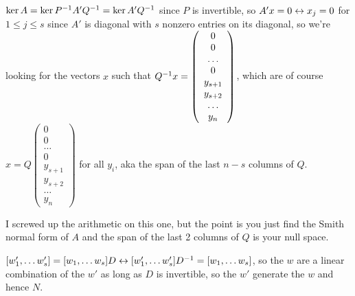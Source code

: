 \documentclass[11pt, oneside]{article}   	%
\begin{document}
\item $\ker{A} = \ker{P^{-1}A'Q^{-1}} = \ker{A'Q^{-1}}$ since $P$ is invertible, so $A'x = 0 \leftrightarrow x_j = 0$ for $1 \le j \le s$ since $A'$ is diagonal with $s$ nonzero entries on its diagonal, so we're looking for the vectors $x$ such that $Q^{-1} x = \left( \begin{array}{c} 0 \\ 0 \\ \ldots \\ 0 \\ y_{s+1} \\ y_{s+2} \\ \ldots \\ y_n \end{array} \right)$, which are of course $x = Q\left( \begin{array}{c} 0 \\ 0 \\ \ldots \\ 0 \\ y_{s+1} \\ y_{s+2} \\ \ldots \\ y_n \end{array} \right)$ for all $y_i$, aka the span of the last $n-s$ columns of $Q$. 
\item I screwed up the arithmetic on this one, but the point is you just find the Smith normal form of $A$ and the span of the last 2 columns of $Q$ is your null space.
\item $[w'_1, \ldots w'_s] = [w_1, \ldots w_s]D \leftrightarrow [w'_1, \ldots w'_s]D^{-1} = [w_1, \ldots w_s]$, so the $w$ are a linear combination of the $w'$ as long as $D$ is invertible, so the $w'$ generate the $w$ and hence $N$.
\ee
\end{document}
